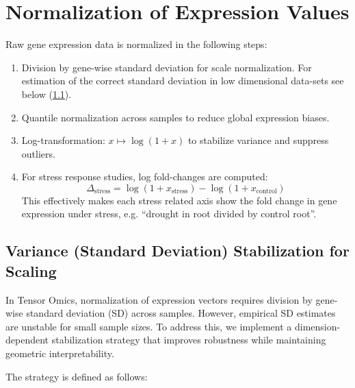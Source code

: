 \documentclass{article}
\begin{document}
\section{Normalization of Expression Values}
Raw gene expression data is normalized in the following steps:
\begin{enumerate}
  \item Division by gene-wise standard deviation for scale normalization. For estimation of the correct standard deviation in low dimensional data-sets see below (\ref{loess_sd_estimation}).
    \item Quantile normalization across samples to reduce global expression biases.
    \item Log-transformation: \( x \mapsto \log(1 + x) \) to stabilize variance and suppress outliers.
    \item For stress response studies, log fold-changes are computed: 
    \[
        \Delta_{\text{stress}} = \log(1 + x_{\text{stress}}) - \log(1 + x_{\text{control}})
    \]
    This effectively makes each stress related axis show the fold change in
    gene expression under stress, e.g. ``drought in root divided by control
    root''.
\end{enumerate}

\subsection{Variance (Standard Deviation) Stabilization for Scaling}
\label{loess_sd_estimation}

In Tensor Omics, normalization of expression vectors requires division by gene-wise standard deviation (SD) across samples.
However, empirical SD estimates are unstable for small sample sizes.
To address this, we implement a dimension-dependent stabilization strategy that improves robustness while maintaining geometric interpretability.

The strategy is defined as follows:
\end{document}
